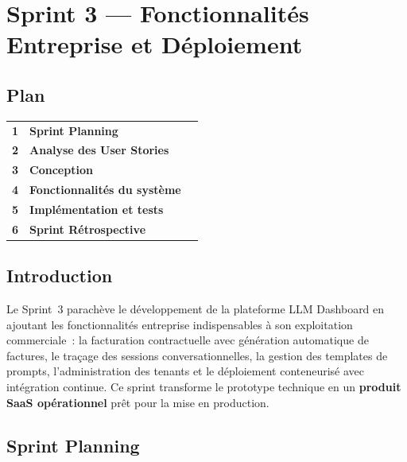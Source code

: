 
\chapter{Sprint 3 --- Fonctionnalités Entreprise et Déploiement}

\section*{Plan}

\begin{tabular}{r l r}
\textbf{1} & \textbf{Sprint Planning} & \textbf{\pageref{sec:s3_planning}} \\
\textbf{2} & \textbf{Analyse des User Stories} & \textbf{\pageref{sec:s3_stories}} \\
\textbf{3} & \textbf{Conception} & \textbf{\pageref{sec:s3_conception}} \\
\textbf{4} & \textbf{Fonctionnalités du système} & \textbf{\pageref{sec:s3_features}} \\
\textbf{5} & \textbf{Implémentation et tests} & \textbf{\pageref{sec:s3_realisation}} \\
\textbf{6} & \textbf{Sprint Rétrospective} & \textbf{\pageref{sec:s3_retro}} \\
\end{tabular}

\section*{Introduction}

Le Sprint~3 parachève le développement de la plateforme LLM Dashboard en ajoutant les fonctionnalités entreprise indispensables à son exploitation commerciale~: la facturation contractuelle avec génération automatique de factures, le traçage des sessions conversationnelles, la gestion des templates de prompts, l'administration des tenants et le déploiement conteneurisé avec intégration continue. Ce sprint transforme le prototype technique en un \textbf{produit SaaS opérationnel} prêt pour la mise en production.

\section{Sprint Planning}
\label{sec:s3_planning}

